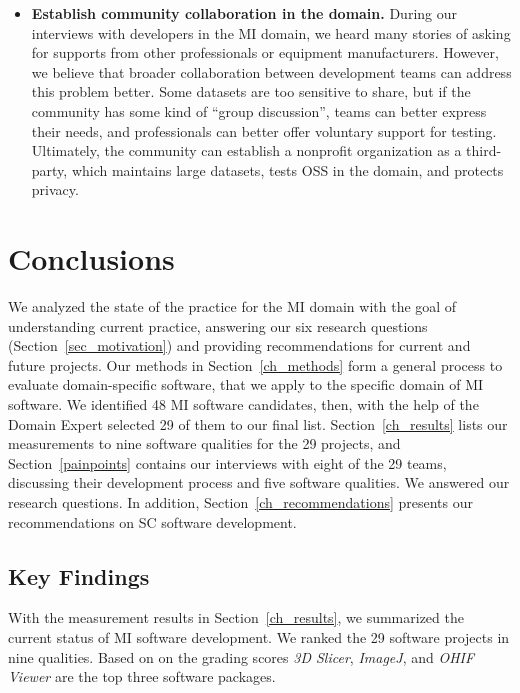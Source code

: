 \documentclass[final, 3p, times, authoryear]{elsarticle}
\begin{document}
\begin{itemize}
\item \textbf{Establish community collaboration in the domain.} During our
interviews with developers in the MI domain, we heard many stories of asking for
supports from other professionals or equipment manufacturers. However, we
believe that broader collaboration between development teams can address this
problem better. Some datasets are too sensitive to share, but if the community
has some kind of ``group discussion'', teams can better express their needs, and
professionals can better offer voluntary support for testing. Ultimately, the
community can establish a nonprofit organization as a third-party, which
maintains large datasets, tests OSS in the domain, and protects privacy. 

\end{itemize}

\section{Conclusions} \label{ch_conclusions}

We analyzed the state of the practice for the MI domain with the goal of
understanding current practice, answering our six research questions
(Section~\ref{sec_motivation}) and providing recommendations for current and
future projects.  Our methods in Section~\ref{ch_methods} form a general process
to evaluate domain-specific software, that we apply to the specific domain of MI
software. We identified 48 MI software candidates, then, with the help of the
Domain Expert selected 29 of them to our final list. Section~\ref{ch_results}
lists our measurements to nine software qualities for the 29 projects, and
Section~\ref{painpoints} contains our interviews with eight of the 29 teams,
discussing their development process and five software qualities.  We answered
our research questions. In addition, Section~\ref{ch_recommendations} presents
our recommendations on SC software development.

\subsection{Key Findings}

With the measurement results in Section~\ref{ch_results}, we summarized the
current status of MI software development. We ranked the 29 software projects in
nine qualities.  Based on on the grading scores \textit{3D Slicer},
\textit{ImageJ}, and \textit{OHIF Viewer} are the top three software packages.
\end{document}
